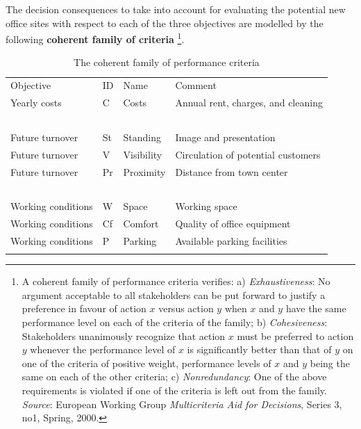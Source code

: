 The decision consequences to take into account for evaluating the potential new office sites with respect to each of the three objectives are modelled by the following \textbf{coherent family of criteria} \footnote{A coherent family of performance criteria verifies: a) \emph{Exhaustiveness}: No argument acceptable to all stakeholders can be put forward to justify a preference in favour of action $x$ versus action $y$  when $x$ and $y$ have the same performance level on each of the criteria of the family; b) \emph{Cohesiveness}: Stakeholders unanimously recognize that action $x$ must be preferred to action $y$ whenever the performance level of $x$ is significantly better than that of $y$ on one of the criteria of positive weight, performance levels of $x$ and $y$ being the same on each of the other criteria; c) \emph{Nonredundancy}: One of the above requirements is violated if one of the criteria is left out from the family. \emph{Source}: European Working Group \emph{Multicriteria Aid for Decisions}, Series 3, no1, Spring, 2000.}.

\begin{table}[h]
\caption{The coherent family of performance criteria}
\label{tab:6.2}       %
\begin{center}
    \begin{tabular}{l|l|l|l}
      \hline\noalign{\smallskip}
      Objective & ID & Name &  Comment\\
      \noalign{\smallskip}\hline\noalign{\smallskip}
    Yearly costs  &       C &   Costs &       Annual rent, charges, and cleaning\\
    \             &  \      & \        &  \ \\
    Future turnover   &   St &   Standing &    Image and presentation\\
    Future turnover   &   V  &  Visibility &  Circulation of potential customers \\
    Future turnover   &   Pr  & Proximity  &  Distance from town center\\
    \                 &   \   & \          &  \  \\
    Working conditions &  W  &  Space   &     Working space\\
    Working conditions &  Cf &  Comfort  &    Quality of office equipment\\
    Working conditions &  P  &  Parking  &    Available parking facilities\\
      \noalign{\smallskip}\hline
    \end{tabular}   
  \end{center}
\end{table}

